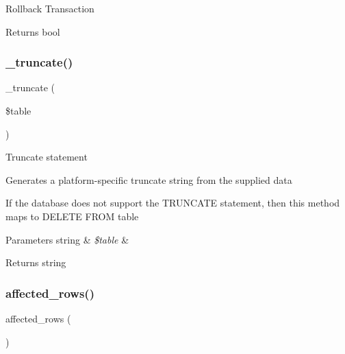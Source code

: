 Rollback Transaction

\begin{DoxyReturn}{Returns}
bool 
\end{DoxyReturn}
\mbox{\label{class_c_i___d_b__oci8__driver_aa029600528fc1ce660a23ff4b4667f95}} 
\subsubsection{\texorpdfstring{\+\_\+truncate()}{\_truncate()}}
{\footnotesize\ttfamily \+\_\+truncate (\begin{DoxyParamCaption}\item[{}]{\$table }\end{DoxyParamCaption})\hspace{0.3cm}{\ttfamily [protected]}}

Truncate statement

Generates a platform-\/specific truncate string from the supplied data

If the database does not support the T\+R\+U\+N\+C\+A\+TE statement, then this method maps to \textquotesingle{}D\+E\+L\+E\+TE F\+R\+OM table\textquotesingle{}


\begin{DoxyParams}[1]{Parameters}
string & {\em \$table} & \\
\hline
\end{DoxyParams}
\begin{DoxyReturn}{Returns}
string 
\end{DoxyReturn}
\mbox{\label{class_c_i___d_b__oci8__driver_a77248aaad33eb132c04cc4aa3f4bc8cb}} 
\subsubsection{\texorpdfstring{affected\+\_\+rows()}{affected\_rows()}}
{\footnotesize\ttfamily affected\+\_\+rows (\begin{DoxyParamCaption}{ }\end{DoxyParamCaption})}

